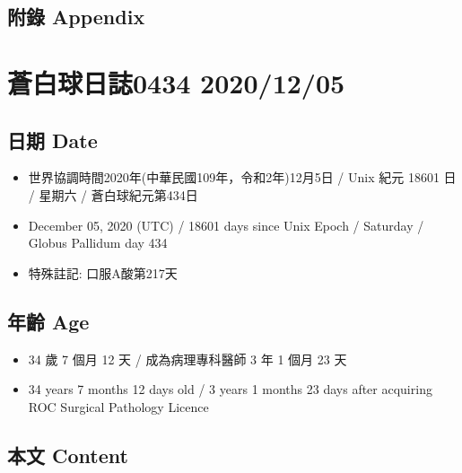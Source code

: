 \documentclass[
]{article}
\providecommand{\tightlist}{%
  \setlength{\itemsep}{0pt}\setlength{\parskip}{0pt}}
\begin{document}
\hypertarget{ux9644ux9304-appendix-3}{%
\subsection{附錄 Appendix}\label{ux9644ux9304-appendix-3}}

\hypertarget{ux84bcux767dux7403ux65e5ux8a8c0434-20201205}{%
\section{蒼白球日誌0434
2020/12/05}\label{ux84bcux767dux7403ux65e5ux8a8c0434-20201205}}

\hypertarget{ux65e5ux671f-date-4}{%
\subsection{日期 Date}\label{ux65e5ux671f-date-4}}

\begin{itemize}
\tightlist
\item
  世界協調時間2020年(中華民國109年，令和2年)12月5日 / Unix 紀元 18601 日
  / 星期六 / 蒼白球紀元第434日
\item
  December 05, 2020 (UTC) / 18601 days since Unix Epoch / Saturday /
  Globus Pallidum day 434
\item
  特殊註記: 口服A酸第217天
\end{itemize}

\hypertarget{ux5e74ux9f61-age-4}{%
\subsection{年齡 Age}\label{ux5e74ux9f61-age-4}}

\begin{itemize}
\tightlist
\item
  34 歲 7 個月 12 天 / 成為病理專科醫師 3 年 1 個月 23 天
\item
  34 years 7 months 12 days old / 3 years 1 months 23 days after
  acquiring ROC Surgical Pathology Licence
\end{itemize}

\hypertarget{ux672cux6587-content-4}{%
\subsection{本文 Content}\label{ux672cux6587-content-4}}
\end{document}
